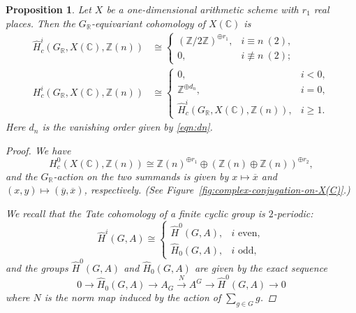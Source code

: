 \documentclass{article}
\newcommand{\CC}{\mathbb{C}}
\newcommand{\RR}{\mathbb{R}}
\newcommand{\ZZ}{\mathbb{Z}}
\theoremstyle{myplain}
\newtheorem{proposition}[theorem]{Proposition}
\theoremstyle{mydefinition}
\begin{document}
\begin{proposition}
  Let $X$ be a one-dimensional arithmetic scheme with $r_1$ real places.
  Then the $G_\RR$-equivariant cohomology of $X(\CC)$ is
  \begin{align}
    \label{eqn:Tate-GR-cohomology-of-X(C)}
    \widehat{H}^i_c (G_\RR, X(\CC), \ZZ (n)) & \cong
                                              \begin{cases}
                                                (\ZZ/2\ZZ)^{\oplus r_1}, & i \equiv n ~ (2), \\
                                                0, & i \not\equiv n ~ (2);
                                              \end{cases} \\
    \label{eqn:usual-GR-cohomology-of-X(C)}
    H^i_c (G_\RR, X(\CC), \ZZ (n)) & \cong
                                    \begin{cases}
                                      0, & i < 0, \\
                                      \ZZ^{\oplus d_n}, & i = 0, \\
                                      \widehat{H}^i_c (G_\RR, X(\CC), \ZZ (n)), & i \ge 1.
                                    \end{cases}
  \end{align}
  Here $d_n$ is the vanishing order given by \eqref{eqn:dn}.

  \begin{proof}
    We have
    \[ H^0_c (X(\CC), \ZZ(n)) \cong
      \ZZ (n)^{\oplus r_1} \oplus (\ZZ (n) \oplus \ZZ (n))^{\oplus r_2}, \]
    and the $G_\RR$-action on the two summands is given by
    $x \mapsto \overline{x}$ and $(x,y) \mapsto (\overline{y}, \overline{x})$,
    respectively. (See Figure~\eqref{fig:complex-conjugation-on-X(C)}.)

    We recall that the Tate cohomology of a finite cyclic group is $2$-periodic:
    \[ \widehat{H}^i (G,A) \cong
      \begin{cases}
        \widehat{H}^0 (G,A), & i\text{ even}, \\
        \widehat{H}_0 (G,A), & i\text{ odd},
      \end{cases} \]
    and the groups $\widehat{H}^0 (G,A)$ and $\widehat{H}_0 (G,A)$ are given by
    the exact sequence
    \[ 0 \to \widehat{H}_0 (G,A) \to
      A_G \xrightarrow{N} A^G \to
      \widehat{H}^0 (G,A) \to 0 \]
    where $N$ is the norm map induced by the action of $\sum_{g\in G} g$.


\end{proof}
\end{proposition}
\end{document}
